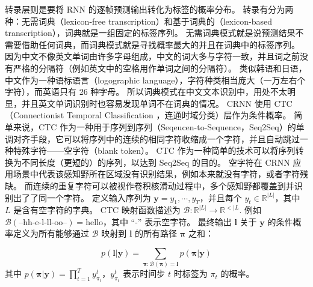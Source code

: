 转录层则是要将 RNN 的逐帧预测输出转化为标签的概率分布。
转录有分为两种：无需词典（lexicon-free transcription）和基于词典的（lexicon-based transcription），词典就是一组固定的标签序列。
无需词典模式就是说预测结果不需要借助任何词典，而词典模式就是寻找概率最大的并且在词典中的标签序列。
因为中文不像英文单词由许多字母组成，中文的词大多与字符一致，并且词之前没有严格的分隔符（例如英文中的空格用作单词之间的分隔符）。
类似韩语和日语，中文作为一种语标语言（logographic language），字符种类相当庞大（一万左右个字符），而英语只有 26 种字母。
所以词典模式在中文文本识别中，用处不太明显，并且英文单词识别时也容易发现单词不在词典的情况。
CRNN 使用 CTC （Connectionist Temporal Classification ，连通时域分类）\cite{CTC}层作为条件概率。
简单来说，CTC 作为一种用于序列到序列（Seqeucen-to-Sequence，Seq2Seq）的单调对齐手段，它可以将序列中的连续的相同字符收缩成一个字符，并且自动跳过一种特殊字符——空字符（blank token）。
CTC 作为一种简单的技术可以将序列转换为不同长度（更短的）的序列，以达到 Seq2Seq 的目的。
空字符在 CRNN 应用场景中代表该感知野所在区域没有识别结果，例如本来就没有字符，或者字符残缺。
而连续的重复字符可以被视作卷积核滑动过程中，多个感知野都覆盖到并识别出了了同一个字符。
定义输入序列为 $\bm{y} = y_1, \cdots, y_T$，并且每个 $y_t \in \mathbb{R}^{|L|}$，其中 $L$ 是含有空字符的字典。
CTC 映射函数描述为 $\mathcal{B}: \mathbb{R}^{|L|} \rightarrow \mathbb{R}^{<|L}$.
例如 $\mathcal{B}(\text{--hh-e-l-ll-oo--}) = \text{hello}$，其中 “-” 表示空字符。
最终输出 $\bm{l}$ 关于 $\bm{y}$ 的条件概率定义为所有能够通过 $\mathcal{B}$ 映射到 $\bm{l}$ 的所有路径 $\bm{\pi}$ 之和：

\begin{equation}
	p(\bm{l} | \bm{y}) = \sum_{\bm{\pi}: \mathcal{B}(\bm{\pi}) = \bm{l}} p(\bm{\pi} | \bm{y})
\end{equation}
其中 $p(\bm{\pi} | \bm{y}) = \prod_{t=1}^T y_{\pi_t}^t$，$y_{\pi_t}^t$ 表示时间步 $t$ 时标签为 $\pi_t$ 的概率。

